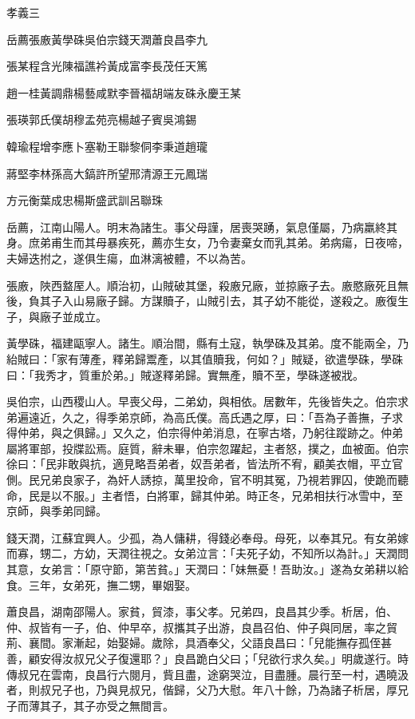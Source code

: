 
\begin{pinyinscope}
孝義三

岳薦張廒黃學硃吳伯宗錢天潤蕭良昌李九

張某程含光陳福譙衿黃成富李長茂任天篤

趙一桂黃調鼎楊藝咸默李晉福胡端友硃永慶王某

張瑛郭氏僕胡穆孟苑亮楊越子賓吳鴻錫

韓瑜程增李應卜塞勒王聯黎侗李秉道趙瓏

蔣堅李林孫高大鎬許所望邢清源王元鳳瑞

方元衡葉成忠楊斯盛武訓呂聯珠

岳薦，江南山陽人。明末為諸生。事父母謹，居喪哭踴，氣息僅屬，乃病羸終其身。庶弟甫生而其母暴疾死，薦亦生女，乃令妻棄女而乳其弟。弟病瘍，日夜啼，夫婦迭拊之，遂俱生瘍，血淋漓被體，不以為苦。

張廒，陜西盩厔人。順治初，山賊破其堡，殺廒兄廠，並掠廠子去。廒愍廠死且無後，負其子入山易廠子歸。方謀贖子，山賊引去，其子幼不能從，遂殺之。廒復生子，與廠子並成立。

黃學硃，福建甌寧人。諸生。順治間，縣有土寇，執學硃及其弟。度不能兩全，乃紿賊曰：「家有薄產，釋弟歸鬻產，以其值贖我，何如？」賊疑，欲遣學硃，學硃曰：「我秀才，質重於弟。」賊遂釋弟歸。實無產，贖不至，學硃遂被戕。

吳伯宗，山西稷山人。早喪父母，二弟幼，與相依。居數年，先後皆失之。伯宗求弟遍遠近，久之，得季弟京師，為高氏僕。高氏遇之厚，曰：「吾為子善撫，子求得仲弟，與之俱歸。」又久之，伯宗得仲弟消息，在寧古塔，乃躬往蹤跡之。仲弟屬將軍部，投牒訟焉。庭質，辭未畢，伯宗忽躍起，主者怒，撲之，血被面。伯宗徐曰：「民非敢與抗，適見略吾弟者，奴吾弟者，皆法所不宥，顧美衣帽，平立官側。民兄弟良家子，為奸人誘掠，萬里投命，官不明其冤，乃視若罪囚，使跪而聽命，民是以不服。」主者悟，白將軍，歸其仲弟。時正冬，兄弟相扶行冰雪中，至京師，與季弟同歸。

錢天潤，江蘇宜興人。少孤，為人傭耕，得錢必奉母。母死，以奉其兄。有女弟嫁而寡，甥二，方幼，天潤往視之。女弟泣言：「夫死子幼，不知所以為計。」天潤問其意，女弟言：「原守節，第苦貧。」天潤曰：「妹無憂！吾助汝。」遂為女弟耕以給食。三年，女弟死，撫二甥，畢姻娶。

蕭良昌，湖南邵陽人。家貧，貿漆，事父孝。兄弟四，良昌其少季。析居，伯、仲、叔皆有一子，伯、仲早卒，叔攜其子出游，良昌召伯、仲子與同居，率之貿荊、襄間。家漸起，始娶婦。歲除，具酒奉父，父語良昌曰：「兒能撫存孤侄甚善，顧安得汝叔兄父子復還耶？」良昌跪白父曰；「兒欲行求久矣。」明歲遂行。時傳叔兄在雲南，良昌行六閱月，貲且盡，途窮哭泣，目盡腫。晨行至一村，遇曉汲者，則叔兄子也，乃與見叔兄，偕歸，父乃大慰。年八十餘，乃為諸子析居，厚兄子而薄其子，其子亦受之無間言。


\end{pinyinscope}
